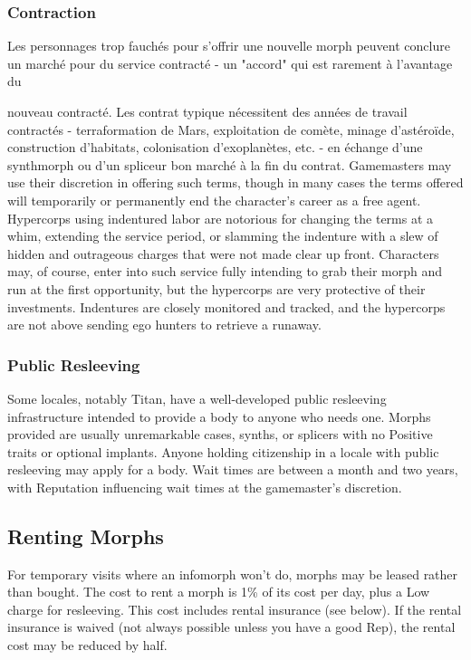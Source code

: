 \subsubsection{Contraction} 

Les personnages trop fauchés pour s'offrir une nouvelle morph peuvent conclure un marché pour du service contracté - un "accord" qui est rarement à l'avantage du 

nouveau contracté. Les contrat typique nécessitent des années de travail contractés - terraformation de Mars, exploitation de comète, minage d'astéroïde, construction d'habitats, colonisation d'exoplanètes, etc. - en échange d'une synthmorph ou d'un spliceur bon marché à la fin du contrat. Gamemasters may use their discretion in offering such terms, though in many cases the terms offered will temporarily or permanently end the character's career as a free agent. Hypercorps using indentured labor are notorious for changing the terms at a whim, extending the service period, or slamming the indenture with a slew of hidden and outrageous charges that were not made clear up front. Characters may, of course, enter into such service fully intending to grab their morph and run at the first opportunity, but the hypercorps are very protective of their investments. Indentures are closely monitored and tracked, and the hypercorps are not above sending ego hunters to retrieve a runaway. 

\subsubsection{Public Resleeving} 

Some locales, notably Titan, have a well-developed public resleeving infrastructure intended to provide a body to anyone who needs one. Morphs provided are usually unremarkable cases, synths, or splicers with no Positive traits or optional implants. Anyone holding citizenship in a locale with public resleeving may apply for a body. Wait times are between a month and two years, with Reputation influencing wait times at the gamemaster's discretion. 

\subsection{Renting Morphs} 

For temporary visits where an infomorph won't do, morphs may be leased rather than bought. The cost to rent a morph is 1\% of its cost per day, plus a Low charge for resleeving. This cost includes rental insurance (see below). If the rental insurance is waived (not always possible unless you have a good Rep), the rental cost may be reduced by half. 

